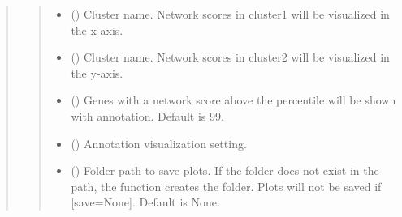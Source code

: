 \documentclass[letterpaper,10pt,english]{sphinxmanual}
\begin{document}
\begin{quote}
\begin{fulllineitems}
\begin{fulllineitems}
\begin{quote}
\begin{description}
\begin{itemize}
\item {} 
 () \textendash{} Cluster name. Network scores in cluster1 will be visualized in the x-axis.

\item {} 
 () \textendash{} Cluster name. Network scores in cluster2 will be visualized in the y-axis.

\item {} 
 () \textendash{} Genes with a network score above the percentile will be shown with annotation. Default is 99.

\item {} 
 (\sphinxstyleliteralemphasis{\sphinxupquote{(}}\sphinxstyleliteralemphasis{\sphinxupquote{, }}\sphinxstyleliteralemphasis{\sphinxupquote{)}}) \textendash{} Annotation visualization setting.

\item {} 
 () \textendash{} Folder path to save plots. If the folder does not exist in the path, the function creates the folder.
Plots will not be saved if {[}save=None{]}. Default is None.

\end{itemize}

\end{description}\end{quote}

\end{fulllineitems}



\end{fulllineitems}
\end{quote}
\end{document}
